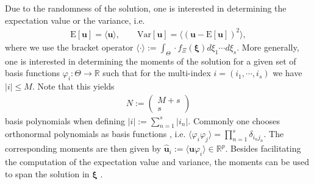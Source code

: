 Due to the randomness of the solution, one is interested in determining the expectation value or the variance, i.e.
\begin{align*}
\text{E}[\bm{u}] = \langle \bm{u} \rangle,\qquad \text{Var}[\bm{u}] = \langle \left( \bm{u}-\text{E}[\bm{u}]\right)^2\rangle,
\end{align*}
where we use the bracket operator $\langle \cdot \rangle := \int_{\Theta} \cdot f_{\Xi}(\bm\xi)d\xi_1 \cdots d\xi_s$. More generally, one is interested in determining the moments of the solution for a given set of basis functions $\varphi_{i}:\Theta\to\mathbb{R}$ such that for the multi-index $i = (i_1,\cdots,i_s)$ we have $|i| \leq M$. Note that this yields
\begin{align*}
N:=\begin{pmatrix}
M+s \\ s
\end{pmatrix}
\end{align*}
basis polynomials when defining $|i|:=\sum_{n = 1}^s |i_n|$. Commonly one chooses orthonormal polynomials as basis functions \cite{xiu2002wiener}, i.e. $\langle \varphi_i \varphi_j \rangle =\prod_{n=1}^s\delta_{i_nj_n}$.  The corresponding moments are then given by $\bm{\hat u}_i := \langle \bm{u}\varphi_i \rangle\in\mathbb{R}^p$. Besides facilitating the computation of the expectation value and variance, the moments can be used to span the solution in $\bm\xi$ \cite{wiener1938homogeneous}. \\

